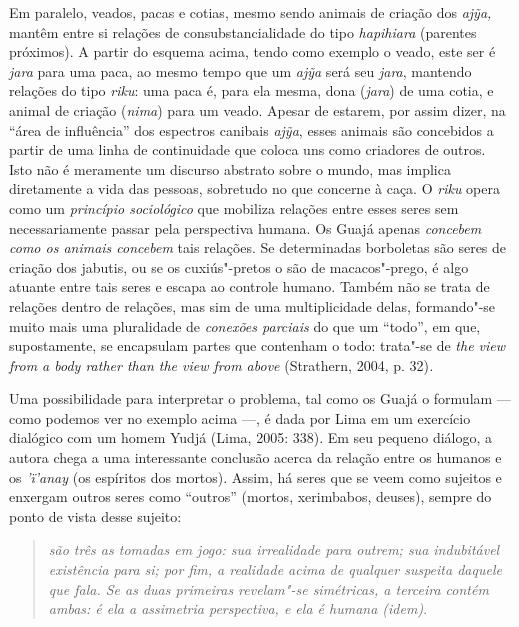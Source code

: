 Em paralelo, veados, pacas e cotias, mesmo sendo animais de criação dos
\emph{ajỹa,} mantêm entre si relações de consubstancialidade do tipo
\emph{hapihiara} (parentes próximos). A partir do esquema acima, tendo
como exemplo o veado, este ser é \emph{jara} para uma paca, ao mesmo
tempo que um \emph{ajỹa} será seu \emph{jara}, mantendo relações do tipo
\emph{riku}: uma paca é, para ela mesma, dona (\emph{jara}) de uma
cotia, e animal de criação (\emph{nima}) para um veado. Apesar de
estarem, por assim dizer, na ``área de influência'' dos espectros canibais
\emph{ajỹa}, esses animais são concebidos a partir de uma linha de
continuidade que coloca uns como criadores de outros. Isto não é
meramente um discurso abstrato sobre o mundo, mas implica diretamente a
vida das pessoas, sobretudo no que concerne à caça. O \emph{riku} opera
como um \emph{princípio sociológico} que mobiliza relações entre esses
seres sem necessariamente passar pela perspectiva humana. Os Guajá
apenas \emph{concebem} \emph{como os animais concebem} tais relações. Se
determinadas borboletas são seres de criação dos jabutis, ou se os
cuxiús"-pretos o são de macacos"-prego, é algo atuante entre tais seres e
escapa ao controle humano. Também não se trata de relações dentro de
relações, mas sim de uma multiplicidade delas, formando"-se muito mais
uma pluralidade de \emph{conexões parciais} do que um ``todo'', em que,
supostamente, se encapsulam partes que contenham o todo: trata"-se de
\emph{the view from a body rather than the view from above} (Strathern,
2004, p. 32)\emph{.}

Uma possibilidade para interpretar o problema, tal como os Guajá o
formulam --- como podemos ver no exemplo acima ---, é dada por Lima em um
exercício dialógico com um homem Yudjá (Lima, 2005: 338). Em seu pequeno
diálogo, a autora chega a uma interessante conclusão acerca da relação
entre os humanos e os \emph{'ï'anay} (os espíritos dos mortos). Assim,
há seres que se veem como sujeitos e enxergam outros seres como ``outros''
(mortos, xerimbabos, deuses), sempre do ponto de vista desse sujeito:

\begin{quote}
\emph{são três as tomadas em jogo: sua irrealidade para outrem; sua
indubitável existência para si; por fim, a realidade acima de qualquer
suspeita daquele que fala. Se as duas primeiras revelam"-se simétricas, a
terceira contém ambas: é ela a assimetria perspectiva, e ela é humana
(\emph{idem})}.
\end{quote}

